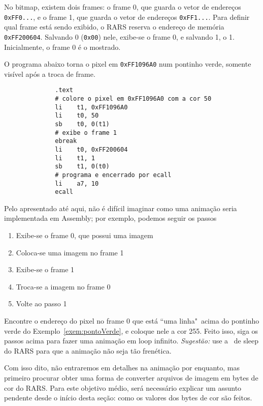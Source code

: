 \documentclass[10pt, a4paper, twoside]{article}
\begin{document}
        No bitmap, existem dois frames: 
        o frame {\color{red} 0}, que guarda o vetor de endereços {\tt 0xFF{\color{red}0}...},
        e o frame {\color{red} 1}, que guarda o vetor de endereços {\tt 0xFF{\color{red}1}...}.
        Para definir qual frame está sendo exibido, o RARS reserva o endereço de memória {\tt 0xFF200604}. 
        Salvando 0 ({\tt 0x00}) nele, exibe-se o frame 0, e salvando 1, o 1.
        Inicialmente, o frame 0 é o mostrado.
        \begin{exemplo}
        \label{exem:pontoVerde}
            O programa abaixo torna o pixel em {\tt 0xFF1096A0} num pontinho verde, somente visível após a troca de frame.
            \begin{lstlisting}
              .text
              # colore o pixel em 0xFF1096A0 com a cor 50
              li	t1, 0xFF1096A0
              li	t0, 50
              sb	t0, 0(t1)
              # exibe o frame 1
              ebreak
              li	t0, 0xFF200604
              li	t1, 1
              sb	t1, 0(t0)
              # programa e encerrado por ecall
              li	a7, 10
              ecall
            \end{lstlisting}
        \end{exemplo}
        Pelo apresentado até aqui, não é difícil imaginar como uma animação seria implementada em Assembly; por exemplo, podemos seguir os passos
        \begin{enumerate}
            \item Exibe-se o frame 0, que possui uma imagem
            \item Coloca-se uma imagem no frame 1
            \item Exibe-se o frame 1
            \item Troca-se a imagem no frame 0
            \item Volte ao passo 1
        \end{enumerate}
        \begin{exercicio}
            Encontre o endereço do pixel no frame 0 que está ``uma linha"~acima do pontinho verde do Exemplo~\ref{exem:pontoVerde}, e coloque nele a cor 255.
            Feito isso, siga os passos acima para fazer uma animação em loop infinito.
            \textit{Sugestão:} use a \ecall~de sleep do RARS para que a animação não seja tão frenética.
        \end{exercicio}
        Com isso dito, não entraremos em detalhes na animação por enquanto, mas primeiro procurar obter uma forma de converter arquivos de imagem em bytes de cor do RARS.
        Para este objetivo médio, será necessário explicar um assunto pendente desde o início desta seção:
        como os valores dos bytes de cor são feitos.
    
\end{document}
